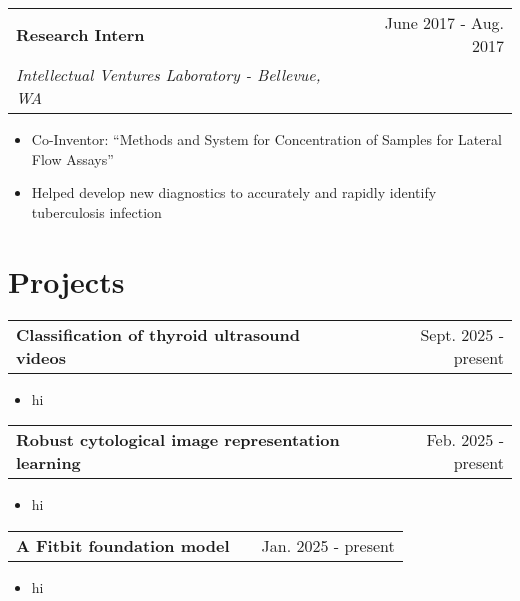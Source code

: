 \documentclass[a4paper,12pt]{article}
\makeatletter
\newenvironment{joblong}[3]
    {
    \begin{tabularx}{\linewidth}{@{}l X r@{}}
    \textbf{#1} & \hfill &  #2 \\
    \textit{#3} & & \\[3.75pt]  
    \end{tabularx}
    \begin{minipage}[t]{\linewidth}
    \begin{itemize}[nosep,after=\strut, leftmargin=1em, itemsep=3pt,label=\scriptsize$\bullet$]
    }
    {
    \end{itemize}
    \end{minipage}    
    }
\newenvironment{projectlong}[2]
    {
    \begin{tabularx}{\linewidth}{@{}l X r@{}}
    \textbf{#1} & \hfill &  #2 \\
    \end{tabularx}
    \begin{minipage}[t]{\linewidth}
    \begin{itemize}[nosep,after=\strut, leftmargin=1em, itemsep=3pt,label=\scriptsize$\bullet$]
    }
    {
    \end{itemize}
    \end{minipage}    
    }
\makeatother
\begin{document}
\begin{joblong}{Research Intern}{June 2017 - Aug. 2017}{Intellectual Ventures Laboratory - Bellevue, WA}
\item Co-Inventor: “Methods and System for Concentration of Samples for Lateral Flow Assays”
\item Helped develop new diagnostics to accurately and rapidly identify tuberculosis infection
\end{joblong}



\section{Projects}

\begin{projectlong}{Classification of thyroid ultrasound videos}{Sept. 2025 - present}
    \item hi
\end{projectlong}

\begin{projectlong}{Robust cytological image representation learning}{Feb. 2025 - present}
    \item hi
\end{projectlong}

\begin{projectlong}{A Fitbit foundation model}{Jan. 2025 - present}
    \item hi
\end{projectlong}



\end{document}
